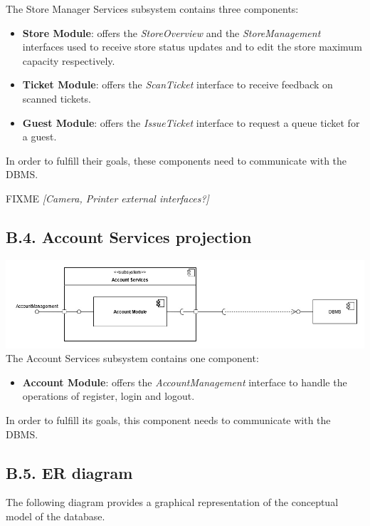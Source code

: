 The Store Manager Services subsystem contains three components:
\begin{itemize}
\item
    \textbf{Store Module}: offers the \emph{StoreOverview} and the
    \emph{StoreManagement} interfaces used to receive store status updates and to edit the store maximum capacity respectively.
\item
    \textbf{Ticket Module}: offers the \emph{ScanTicket} interface to receive feedback on scanned tickets.
\item
    \textbf{Guest Module}: offers the \emph{IssueTicket} interface to request a queue ticket for a guest.
\end{itemize}

In order to fulfill their goals, these components need to communicate with the DBMS.

FIXME \emph{[Camera, Printer external interfaces?]}

\subsection{B.4. Account Services projection}

\includegraphics{components_view/account_services_projection}
The Account Services subsystem contains one component:
\begin{itemize}
\item
    \textbf{Account Module}: offers the \emph{AccountManagement} interface to handle the operations of register, login and logout.
\end{itemize}

In order to fulfill its goals, this component needs to communicate with the DBMS.

\subsection{B.5. ER diagram}

The following diagram provides a graphical representation of the conceptual model of the database.

